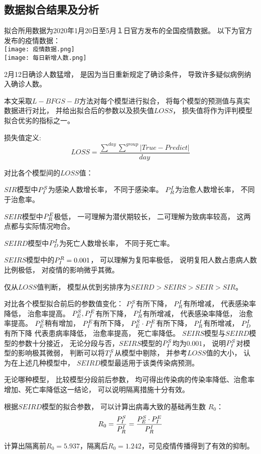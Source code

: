 \subsection{数据拟合结果及分析}
\par 拟合所用数据为2020年1月20日至5月１日官方发布的全国疫情数据。
以下为官方发布的疫情数据：
\\
\texttt{[image: 疫情数据.png]}
\\
\texttt{[image: 每日新增人数.png]}
\par
2月12日确诊人数猛增，
是因为当日重新规定了确诊条件，
导致许多疑似病例纳入确诊人数。
\par 本文采取$L-BFGS-B$方法对每个模型进行拟合，
将每个模型的预测值与真实数据进行对比，
并给出拟合后的参数以及损失值$LOSS$，
损失值将作为评判模型拟合优劣的指标之一。
\par 损失值定义:
\begin{equation}
    LOSS = \frac{\sum\limits^{day}\sum\limits^{group}
        \left|True-Predict\right|}{day}
\end{equation}
\par 对比各个模型间的$LOSS$值：
\par $SIR$模型中$\P{S}{I}$为感染人数增长率，
不同于感染率。
$\P{I}{R}$为治愈人数增长率，
不同于治愈率。
\par $SEIR$模型中$\P{E}{R}$极低，
一可理解为潜伏期较长，
二可理解为致病率较高，
这两点都与实际情况吻合。
\par $SEIRD$模型中$\P{I}{D}$为死亡人数增长率，
不同于死亡率。
\par $SEIRS$模型中的$\P{R}{I}=0.001$，
可以理解为复阳率极低，
说明复阳人数占患病人数比例极低，
对疫情的影响微乎其微。
\par 仅从$LOSS$值判断，
模型从优到劣排序为$SEIRD>SEIRS>SEIR>SIR$。
\par 对比各个模型拟合前后的参数值变化：
$\P{S}{I}$有所下降，
$\P{I}{R}$有所增减，
代表感染率降低，
治愈率提高。
$\P{S}{E},\P{E}{I}$有所下降，
$\P{I}{R}$有所增减，
代表感染率降低，
治愈率提高。
$\P{S}{E}$稍有增加，
$\P{E}{I}$有所下降，
$\P{S}{E}\cdot \P{E}{I}$有所下降，
$\P{I}{R}$有所增减，
$\P{I}{D}$有所下降
代表患病率降低，
治愈率提高，
死亡率降低。
$SEIRS$模型与$SEIRD$模型的参数十分接近，
无论分段与否，$SEIRS$模型的$\P{S}{I}$均为$0.001$，
说明$\P{S}{I}$对模型的影响极其微弱，
判断可以将$\T{S}{I}$从模型中剔除，
并参考$LOSS$值的大小，
认为在上述几种模型中，
$SEIRD$模型最适用于该类传染病预测。
\par 无论哪种模型，
比较模型分段前后参数，
均可得出传染病的传染率降低、治愈率增加、死亡率降低这一结论，
可以说明隔离措施十分有效。
\par 根据$SEIRD$模型的拟合参数，
可以计算出病毒大致的基础再生数
$R_0$\cite{应用SEIR模型预测2009年甲型H1N1流感流行趋势,王宝童2013流感传播数学模型的基本再生数}：
\begin{equation}
    R_0 = \frac{\P{S}{I}}{\P{I}{R}}
    = \frac{\P{S}{E}\cdot \P{E}{I}}{\P{I}{R}}
\end{equation}
\par 计算出隔离前$R_0=5.937$，隔离后$R_0=1.242$，可见疫情传播得到了有效的抑制。